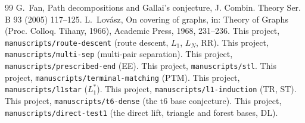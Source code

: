 \documentclass[11pt]{amsart}
\theoremstyle{definition}
\begin{document}
\begin{thebibliography}{99}
 G.~Fan, Path decompositions and Gallai's conjecture, J. Combin. Theory Ser. B 93
(2005) 117--125.
 L.~Lov\'asz, On covering of graphs, in: Theory of Graphs (Proc. Colloq. Tihany,
1966), Academic Press, 1968, 231--236.
 This project, \texttt{manuscripts/route-descent} (route descent, $L_1$, $L_N$, RR).
 This project, \texttt{manuscripts/multi-sep} (multi-pair separation).
 This project, \texttt{manuscripts/prescribed-end} (EE).
 This project, \texttt{manuscripts/stl}.
 This project, \texttt{manuscripts/terminal-matching} (PTM).
 This project, \texttt{manuscripts/l1star} ($L_1^*$).
 This project, \texttt{manuscripts/l1-induction} (TR, ST).
 This project, \texttt{manuscripts/t6-dense} (the t6 base conjecture).
 This project, \texttt{manuscripts/direct-test1} (the direct lift, triangle and forest
bases, DL).
\end{thebibliography}
\end{document}
